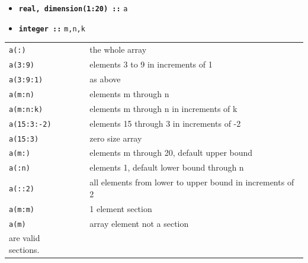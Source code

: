 \documentclass[slidestop,mathserif,compress,xcolor=svgnames]{beamer}
\newenvironment{bblock}[0]
{
\begin{beamerboxesrounded}[upper=uppercol1,lower=lowercol1,shadow=true]}
{\end{beamerboxesrounded}}
\begin{document}
\begin{frame}[allowframebreaks]
  \begin{bblock}{}
    \begin{itemize}
      \item[] \textbf{\texttt{real, dimension(1:20) ::}} \texttt{a}
      \item[] \textbf{\texttt{integer ::}} \texttt{m,n,k}
    \end{itemize}
    \begin{center}
      \begin{tabular}{lcl}
        {\texttt{a(:)}} &  & the whole array \\
        {\texttt{a(3:9)}} &  & elements 3 to 9 in increments of 1 \\
        {\texttt{a(3:9:1)}} &  & as above \\
        {\texttt{a(m:n)}} &  & elements m through n\\
        {\texttt{a(m:n:k)}} &  & elements m through n in increments of k \\
        {\texttt{a(15:3:-2)}} &  & elements 15 through 3 in increments of -2 \\
        {\texttt{a(15:3)}} &  & zero size array \\
        {\texttt{a(m:)}} &  & elements m through 20, default upper bound \\
        {\texttt{a(:n)}} &  & elements 1, default lower bound through n \\
        {\texttt{a(::2)}} &  & all elements from lower to upper bound in increments of 2 \\
        {\texttt{a(m:m)}} &  & 1 element section \\
        {\texttt{a(m)}} &  & array element not a section \\
        are valid sections. & & \\
      \end{tabular}
    \end{center}
  \end{bblock}
\end{frame}
\end{document}
